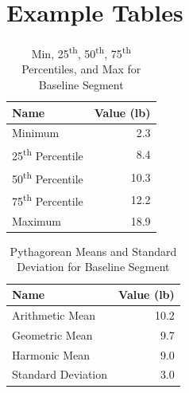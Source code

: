 %
\newpage
\section{Example Tables}
%
\begin{table}[ht]
    \centering
    \begin{tabular}{l|r}
        \textbf{Name} & \textbf{Value} (lb) \\
        \hline
		Minimum & 2.3 \\
		25\textsuperscript{th} Percentile & 8.4 \\
		50\textsuperscript{th} Percentile & 10.3 \\
		75\textsuperscript{th} Percentile & 12.2 \\
		Maximum & 18.9 \\
		\hline
	\end{tabular}
    \caption{Min, 25\textsuperscript{th}, 50\textsuperscript{th}, 75\textsuperscript{th} Percentiles, and Max for Baseline Segment}
    \label{table:00.baseline.descriptive}
\end{table}
%
\begin{table}[ht]
    \centering
    \begin{tabular}{l|r}
		\textbf{Name} & \textbf{Value} (lb) \\
        \hline
		Arithmetic Mean & 10.2 \\
		Geometric Mean & 9.7 \\
        Harmonic Mean & 9.0 \\
        \hline
        Standard Deviation & 3.0 \\
		\hline
	\end{tabular}
    \caption{Pythagorean Means and Standard Deviation for Baseline Segment}
    \label{table:00.baseline.means}
\end{table}
